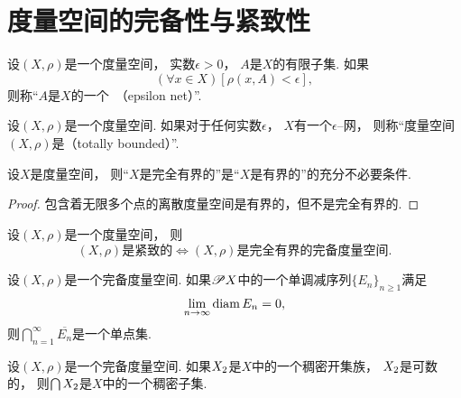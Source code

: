 \section{度量空间的完备性与紧致性}
\begin{definition}
设\((X,\rho)\)是一个度量空间，
实数\(\epsilon>0\)，
\(A\)是\(X\)的有限子集.
如果\[
	(\forall x \in X)
	[\rho(x,A) < \epsilon],
\]
则称“\(A\)是\(X\)的一个~（epsilon net）”.
\end{definition}

\begin{definition}
设\((X,\rho)\)是一个度量空间.
如果对于任何实数\(\epsilon\)，
\(X\)有一个\(\epsilon\)--网，
则称“度量空间\((X,\rho)\)是（totally bounded）”.
\end{definition}

\begin{proposition}
设\(X\)是度量空间，
则“\(X\)是完全有界的”是“\(X\)是有界的”的充分不必要条件.
\begin{proof}
包含着无限多个点的离散度量空间是有界的，但不是完全有界的.
\end{proof}
\end{proposition}

\begin{theorem}
设\((X,\rho)\)是一个度量空间，
则\[
	\text{$(X,\rho)$是紧致的}
	\iff
	\text{$(X,\rho)$是完全有界的完备度量空间}.
\]
\end{theorem}

\begin{theorem}
设\((X,\rho)\)是一个完备度量空间.
如果\(\mathscr{P} X\)中的一个单调减序列\(\{E_n\}_{n\geq1}\)满足\[
	\lim_{n\to\infty} \operatorname{diam} E_n = 0,
\]
则\(\bigcap_{n=1}^\infty \overline{E_n}\)是一个单点集.
\end{theorem}

\begin{theorem}[贝尔定理]
设\((X,\rho)\)是一个完备度量空间.
如果\(X_2\)是\(X\)中的一个稠密开集族，
\(X_2\)是可数的，
则\(\bigcap X_2\)是\(X\)中的一个稠密子集.
\end{theorem}
